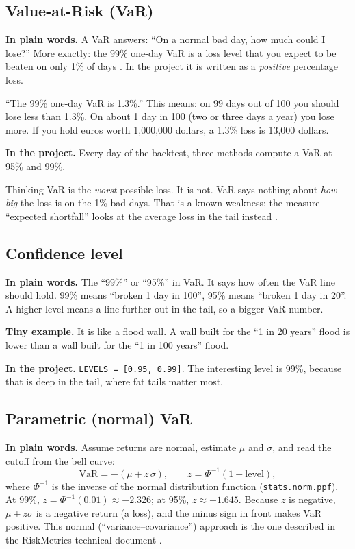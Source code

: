 \documentclass[11pt,a4paper]{article}
\newcommand{\term}[1]{\subsection{#1}}
\newcommand{\plain}{\textbf{In plain words.} }
\newcommand{\inproj}{\textbf{In the project.} }
\newcommand{\tinyex}{\textbf{Tiny example.} }
\newcommand{\code}[1]{\texttt{#1}}
\begin{document}
\term{Value-at-Risk (VaR)}\label{g:var}
\plain A VaR answers: ``On a normal bad day, how much could I lose?'' More
exactly: the 99\% one-day VaR is a loss level that you expect to be beaten
on only 1\% of days \citep{jorion2007}. In the project it is written as a
\emph{positive} percentage loss.

\begin{example}
``The 99\% one-day VaR is 1.3\%.'' This means: on 99 days out of 100 you
should lose less than 1.3\%. On about 1 day in 100 (two or three days a
year) you lose more. If you hold euros worth 1{,}000{,}000 dollars, a 1.3\%
loss is 13{,}000 dollars.
\end{example}

\inproj Every day of the backtest, three methods compute a VaR at 95\% and
99\%.

\begin{mistake}
Thinking VaR is the \emph{worst} possible loss. It is not. VaR says nothing
about \emph{how big} the loss is on the 1\% bad days. That is a known
weakness; the measure ``expected shortfall'' looks at the average loss in
the tail instead \citep{artzner1999}.
\end{mistake}

\term{Confidence level}\label{g:level}
\plain The ``99\%'' or ``95\%'' in VaR. It says how often the VaR line should
hold. 99\% means ``broken 1 day in 100'', 95\% means ``broken 1 day in 20''.
A higher level means a line further out in the tail, so a bigger VaR number.

\tinyex It is like a flood wall. A wall built for the ``1 in 20 years''
flood is lower than a wall built for the ``1 in 100 years'' flood.

\inproj \code{LEVELS = [0.95, 0.99]}. The interesting level is 99\%,
because that is deep in the tail, where fat tails matter most.

\term{Parametric (normal) VaR}\label{g:varnormal}
\plain Assume returns are normal, estimate $\mu$ and $\sigma$, and read the
cutoff from the bell curve:
\[
  \text{VaR} = -(\mu + z\,\sigma), \qquad z = \Phi^{-1}(1-\text{level}),
\]
where $\Phi^{-1}$ is the inverse of the normal distribution function
(\code{stats.norm.ppf}). At 99\%, $z = \Phi^{-1}(0.01) \approx -2.326$; at
95\%, $z \approx -1.645$. Because $z$ is negative, $\mu + z\sigma$ is a
negative return (a loss), and the minus sign in front makes VaR positive.
This normal (``variance--covariance'') approach is the one described in the
RiskMetrics technical document \citep{riskmetrics1996}.
\end{document}
